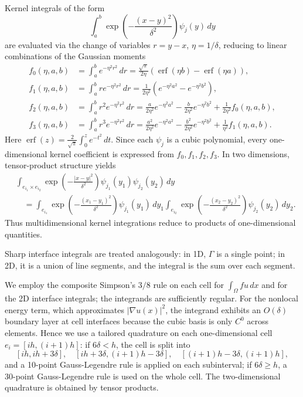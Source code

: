 \documentclass{article}
\theoremstyle{definition}
\begin{document}
Kernel integrals of the form
\[
  \int_a^b \exp\left(-\frac{(x-y)^2}{\delta^2}\right)\psi_j(y)\,dy
\]
are evaluated via the change of variables $r=y-x$, $\eta=1/\delta$, reducing to linear combinations of the Gaussian moments
\begin{align*}
f_0(\eta,a,b)&=\int_a^b e^{-\eta^2r^2}\,dr
=\frac{\sqrt{\pi}}{2\eta}\left(\operatorname{erf}(\eta b)-\operatorname{erf}(\eta a)\right),\\
f_1(\eta,a,b)&=\int_a^b r e^{-\eta^2r^2}\,dr
=\frac{1}{2\eta^2}\left(e^{-\eta^2a^2}-e^{-\eta^2b^2}\right),\\
f_2(\eta,a,b)&=\int_a^b r^2 e^{-\eta^2r^2}\,dr=\frac{a}{2\eta^2}e^{-\eta^2a^2}
-\frac{b}{2\eta^2}e^{-\eta^2b^2}
+\frac{1}{2\eta^2}f_0(\eta,a,b),\\
f_3(\eta,a,b)&=\int_a^b r^3 e^{-\eta^2r^2}\,dr=\frac{a^2}{2\eta^2}e^{-\eta^2a^2}
-\frac{b^2}{2\eta^2}e^{-\eta^2b^2}
+\frac{1}{\eta^2}f_1(\eta,a,b).
\end{align*}
Here $\operatorname{erf}(z)=\frac{2}{\sqrt{\pi}}\int_0^z e^{-t^2}\,dt$. Since each $\psi_j$ is a cubic polynomial, every one-dimensional kernel coefficient is expressed from $f_0,f_1,f_2,f_3$.
In two dimensions, tensor-product structure yields
\begin{align*}
&\int_{e_{i_1}\times e_{i_2}}
\exp\left(-\frac{|x-y|^2}{\delta^2}\right)
\psi_{j_1}(y_1)\psi_{j_2}(y_2)\,dy\\
&\quad =
\int_{e_{i_1}}\exp\left(-\frac{(x_1-y_1)^2}{\delta^2}\right)\psi_{j_1}(y_1)\,dy_1
\int_{e_{i_2}}\exp\left(-\frac{(x_2-y_2)^2}{\delta^2}\right)\psi_{j_2}(y_2)\,dy_2.
\end{align*}
Thus multidimensional kernel integrations reduce to products of one-dimensional quantities.

Sharp interface integrals are treated analogously: in 1D, $\Gamma$ is a single point; in 2D, it is a union of line segments, and the integral is the sum over each segment.

We employ the composite Simpson's $3/8$ rule on each cell for $\int_\Omega f u\,dx$ and for the 2D interface integrals; the integrands are sufficiently regular. For the nonlocal energy term, which approximates $|\nabla u(x)|^2$, the integrand exhibits an $O(\delta)$ boundary layer at cell interfaces because the cubic basis is only $C^0$ across elements. Hence we use a tailored quadrature on each one-dimensional cell $e_i=[ih,(i+1)h]$: if $6\delta<h$, the cell is split into
\[
[ih,ih+3\delta],\quad [ih+3\delta,(i+1)h-3\delta],\quad [(i+1)h-3\delta,(i+1)h],
\]
and a 10-point Gauss-Legendre rule is applied on each subinterval; if $6\delta\ge h$, a 30-point Gauss-Legendre rule is used on the whole cell. The two-dimensional quadrature is obtained by tensor products.
\end{document}
